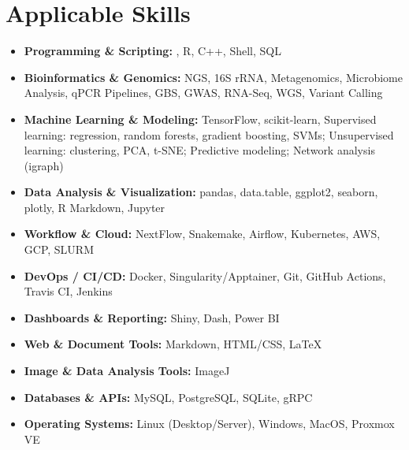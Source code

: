 
\section*{Applicable Skills}

\begin{itemize}[left=0cm, itemsep=0.1cm, label={}]
  \item \textbf{Programming \& Scripting:} \mbox{}, R, C++, Shell, SQL
  \item \textbf{Bioinformatics \& Genomics:} NGS, 16S rRNA, Metagenomics, Microbiome Analysis, qPCR Pipelines, GBS, GWAS, RNA-Seq, WGS, Variant Calling
  \item \textbf{Machine Learning \& Modeling:} TensorFlow, scikit-learn, Supervised learning: regression, random forests, gradient boosting, SVMs; Unsupervised learning: clustering, PCA, t-SNE; Predictive modeling; Network analysis (igraph)
  \item \textbf{Data Analysis \& Visualization:} pandas, data.table, ggplot2, seaborn, plotly, R Markdown, Jupyter
  \item \textbf{Workflow \& Cloud:} NextFlow, Snakemake, Airflow, Kubernetes, AWS, GCP, SLURM
  \item \textbf{DevOps / CI/CD:} Docker, Singularity/Apptainer, Git, GitHub Actions, Travis CI, Jenkins
  \item \textbf{Dashboards \& Reporting:} Shiny, Dash, Power BI
  \item \textbf{Web \& Document Tools:} Markdown, HTML/CSS, \LaTeX
  \item \textbf{Image \& Data Analysis Tools:} ImageJ
  \item \textbf{Databases \& APIs:} MySQL, PostgreSQL, SQLite, gRPC
  \item \textbf{Operating Systems:} Linux (Desktop/Server), Windows, MacOS, Proxmox VE
\end{itemize}





